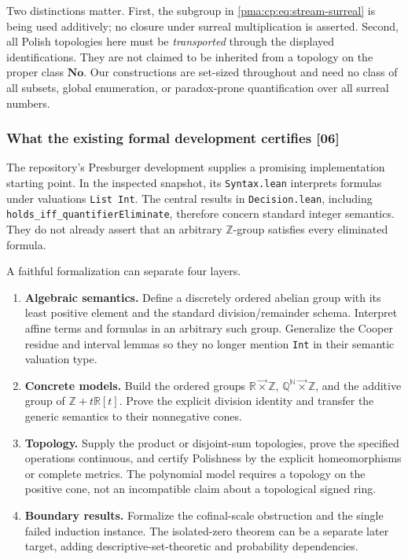 \documentclass[11pt]{article}
\numberwithin{equation}{section}
\theoremstyle{definition}
\theoremstyle{remark}
\newcommand{\N}{\mathbb N}
\newcommand{\Z}{\mathbb Z}
\newcommand{\Q}{\mathbb Q}
\newcommand{\R}{\mathbb R}
\newcommand{\No}{\mathbf{No}}
\newcommand{\lex}{\mathbin{\overrightarrow\times}}
\newcommand{\src}[1]{\textup{\textsf{\small[#1]}}}
\begin{document}
Two distinctions matter. First, the subgroup in
\eqref{pma:cp:eq:stream-surreal} is being used additively; no closure under
surreal multiplication is asserted. Second, all Polish topologies
here must be \emph{transported} through the displayed identifications.
They are not claimed to be inherited from a topology on the proper
class $\No$. Our constructions are set-sized throughout and need no
class of all subsets, global enumeration, or paradox-prone
quantification over all surreal numbers.

\subsubsection{What the existing formal development certifies \src{06}}

The repository's Presburger development supplies a promising
implementation starting point. In the inspected snapshot, its
\texttt{Syntax.lean} interprets formulas under valuations
\texttt{List Int}. The central results in
\texttt{Decision.lean}, including
\texttt{holds\_iff\_quantifierEliminate}, therefore concern standard
integer semantics. They do not already assert that an arbitrary
$\Z$-group satisfies every eliminated formula.

A faithful formalization can separate four layers.
\begin{enumerate}
\item \textbf{Algebraic semantics.} Define a discretely ordered
abelian group with its least positive element and the standard
division/remainder schema. Interpret affine terms and formulas in
an arbitrary such group. Generalize the Cooper residue and interval
lemmas so they no longer mention \texttt{Int} in their semantic
valuation type.
\item \textbf{Concrete models.} Build the ordered groups
$\R\lex\Z$, $\Q^{\N}\lex\Z$, and the additive group of
$\Z+t\R[t]$. Prove the explicit division identity and transfer
the generic semantics to their nonnegative cones.
\item \textbf{Topology.} Supply the product or disjoint-sum
topologies, prove the specified operations continuous, and certify
Polishness by the explicit homeomorphisms or complete metrics.
The polynomial model requires a topology on the positive cone,
not an incompatible claim about a topological signed ring.
\item \textbf{Boundary results.} Formalize the cofinal-scale
obstruction and the single failed induction instance. The
isolated-zero theorem can be a separate later target, adding
descriptive-set-theoretic and probability dependencies.
\end{enumerate}
\end{document}
